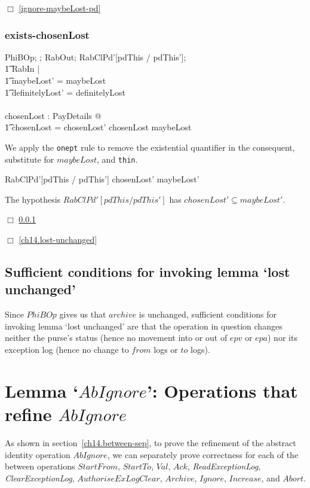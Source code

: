$\Box$ \ref{ignore-maybeLost-pd}

\subsubsection{exists-chosenLost}
\label{ignore-maybeLost-cl}

\begin{gzed}
  PhiBOp; \BOpXiLostPurseOkay; RabOut; RabClPd'[pdThis / pdThis'];
  \\ %
  \t1 RabIn |
  \\ %
  \t1 maybeLost' = maybeLost
  \\ %
  \t1 \land definitelyLost' = definitelyLost
  \\ %
  \shows
  \\ %
  \exists chosenLost : \power PayDetails @
  \\ %
  \t1 chosenLost = chosenLost' \land chosenLost \subseteq maybeLost
\end{gzed}
We apply the \texttt{onept} rule to remove the existential quantifier in
the consequent, substitute for $maybeLost$, and \texttt{thin}.
\begin{gzed}
  RabClPd'[pdThis / pdThis']
  \shows chosenLost' \subseteq maybeLost'
\end{gzed}
The hypothesis $ RabClPd'[pdThis / pdThis'] $ has $chosenLost'
\subseteq maybeLost'$.

$\Box$ \ref{ignore-maybeLost-cl}

$\Box$ \ref{ch14.lost-unchanged}
\subsection{Sufficient conditions for invoking lemma `lost unchanged'}
\label{sufficient-conditions}
Since $PhiBOp$ gives us that $archive$ is unchanged, sufficient
conditions for invoking lemma `lost unchanged' are that the
operation in question changes neither the purse's status (hence no
movement into or out of $epv$ or $epa$) nor its exception log (hence
no change to $from$ logs or $to$ logs).
\section{Lemma `$AbIgnore$': Operations that refine $AbIgnore$}
\label{abignore}
As shown in section~\ref{ch14.between-sep}, to prove the refinement of
the abstract identity operation $AbIgnore$, we can separately prove
correctness for each of the between operations $StartFrom$,
$StartTo$, $Val$, $Ack$, {\it ReadExceptionLog}, {\it
  ClearExceptionLog}, $AuthoriseExLogClear$, $Archive$,
$Ignore$, $Increase$, and $Abort$.

